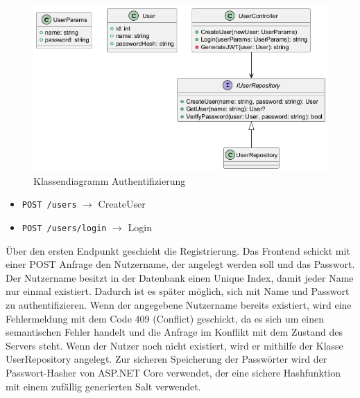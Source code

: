\begin{figure}[htb]
    \includegraphics[width=\linewidth]{images/diagrams/auth.png}
    \caption{Klassendiagramm Authentifizierung}
    \label{fig:cd_auth}
\end{figure}

\begin{itemize}
    \item \lstinline{POST /users} $\rightarrow$ CreateUser
    \item \lstinline{POST /users/login} $\rightarrow$ Login
\end{itemize}

Über den ersten Endpunkt geschieht die Registrierung. Das Frontend schickt mit einer POST Anfrage den Nutzername, der angelegt werden soll und das Passwort. Der Nutzername besitzt in der Datenbank einen Unique Index, damit jeder Name nur einmal existiert. Dadurch ist es später möglich, sich mit Name und Passwort zu authentifizieren.
Wenn der angegebene Nutzername bereits existiert, wird eine Fehlermeldung mit dem Code 409 (Conflict) geschickt, da es sich um einen semantischen Fehler handelt und die Anfrage im Konflikt mit dem Zustand des Servers steht. %
Wenn der Nutzer noch nicht existiert, wird er mithilfe der Klasse UserRepository angelegt.
Zur sicheren Speicherung der Passwörter wird der Passwort-Hasher von ASP.NET Core verwendet, der eine sichere Hashfunktion mit einem zufällig generierten Salt verwendet.


